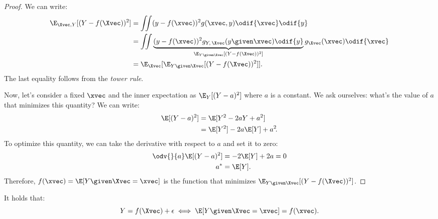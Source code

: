 \begin{proof}
    We can write:
    \begin{equation}
        \begin{aligned}
            \E_{\Xvec, Y}[(Y - f(\Xvec))^2] & = \iint (y - f(\xvec))^2 g(\xvec, y) \odif{\xvec} \odif{y}                                                                                                   \\
                                            & = \iint \underbrace{(y - f(\xvec))^2 g_{Y\negthinspace,\,\Xvec}(y \given \xvec) \odif{y}}_{\E_{Y\given \Xvec}[(Y - f(\Xvec))^2]} g_{\Xvec}(\xvec) \odif{\xvec} \\
                                            & = \E_{\Xvec}[\E_{Y\given \Xvec}[(Y - f(\Xvec))^2]].
        \end{aligned}
    \end{equation}
    The last equality follows from the \emph{tower rule}.

    Now, let's consider a fixed $\xvec$ and the inner expectation as $\E_Y[(Y - a)^2]$ where $a$ is a constant. We ask ourselves: what's the value of $a$ that minimizes this quantity? We can write:
    \begin{equation}
        \begin{aligned}
            \E[(Y - a)^2] & = \E[Y^2 - 2aY + a^2]                   \\
                          & = \E[Y^2] - 2a\E[Y] + a^2\negthinspace.
        \end{aligned}
    \end{equation}
    To optimize this quantity, we can take the derivative with respect to $a$ and set it to zero:
    \begin{equation}
        \begin{aligned}
            \odv{}{a}\E[(Y - a)^2] & = -2\E[Y] + 2a = 0 \\
            a^*                    & = \E[Y].
        \end{aligned}
    \end{equation}
    Therefore, $f(\xvec) = \E[Y \given \Xvec = \xvec]$ is the function that minimizes $\E_{Y\given \Xvec}[(Y - f(\Xvec))^2]$.
\end{proof}

\begin{note}
    It holds that:
    \begin{equation}
        Y = f(\Xvec) + \epsilon \iff \E[Y \given \Xvec = \xvec] = f(\xvec).\qedhere
    \end{equation}
\end{note}

